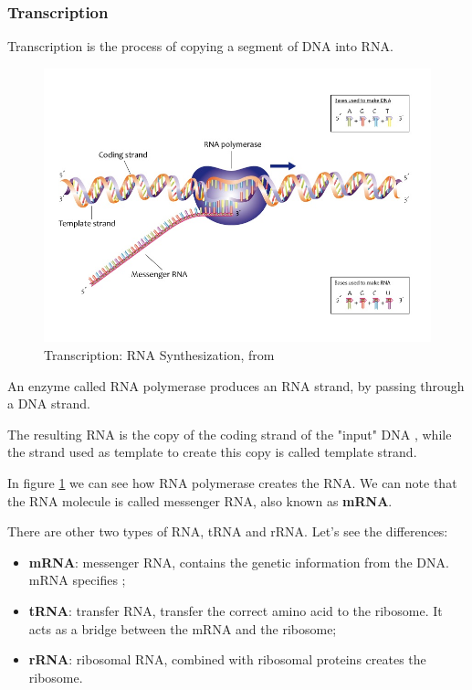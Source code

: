 \subsubsection{Transcription}
Transcription is the process of copying a segment of DNA into RNA.

\begin{figure}[h!]
	\includegraphics[scale=.53]{res/proteins_overview/rna_polymerase.jpeg}
	\centering
	\caption{Transcription: RNA Synthesization, from \cite{transcription}}
	\label{fig:transcription}
\end{figure}

An enzyme called RNA polymerase produces an RNA strand, by passing through a DNA strand. 

The resulting RNA is the copy of the coding strand of the "input" DNA , while the strand used as template to create this copy is called template strand.

In figure \ref{fig:transcription} we can see how RNA polymerase creates the RNA. We can note that the RNA molecule is called messenger RNA, also known as \textbf{mRNA}.

There are other two types of RNA, tRNA and rRNA. Let's see the differences:
\begin{itemize}
	\item \textbf{mRNA}: messenger RNA, contains the genetic information from the DNA. mRNA specifies ;
	\item \textbf{tRNA}: transfer RNA, transfer the correct amino acid to the ribosome. It acts as a bridge between the mRNA and the ribosome;
	\item \textbf{rRNA}: ribosomal RNA, combined with ribosomal proteins creates the ribosome.
\end{itemize}


